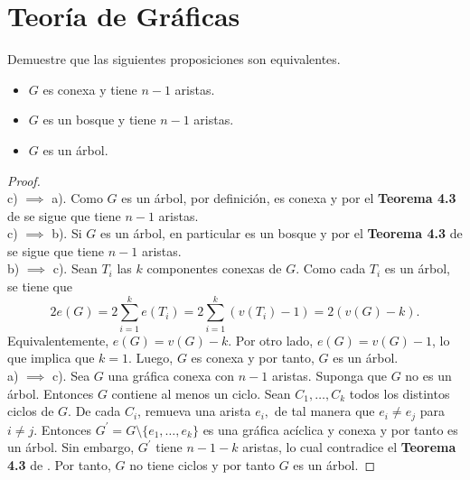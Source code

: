 \documentclass[12pt]{article}
\newenvironment{problem}[2][Problema]{\begin{trivlist}
\item[\hskip \labelsep {\bfseries #1}\hskip \labelsep {\bfseries #2.}]}{\end{trivlist}}
\begin{document}
\section*{Teoría de Gráficas}


\begin{problem}{4.1.2}
Demuestre que las siguientes proposiciones son equivalentes. 
\begin{itemize}
    \item[a)] $G$ es conexa y tiene $n-1$ aristas.
    \item[b)] $G$ es un bosque y tiene $n-1$ aristas.
    \item[c)] $G$ es un árbol.
\end{itemize}
\end{problem}

\begin{proof} \textbf{}\\
c) $\implies$ a). Como $G$ es un árbol, por definición, es conexa y por el  \textbf{Teorema 4.3} de \cite{10.5555/1481153} se sigue que tiene $n-1$ aristas. \\
c) $\implies$ b). Si $G$ es un árbol, en particular es un bosque y por el \textbf{Teorema 4.3} de \cite{10.5555/1481153} se sigue que tiene $n-1$ aristas.\\
b) $\implies$ c). Sean $T_i$ las $k$ componentes conexas de $G$. Como cada $T_i$ es un árbol, se tiene que
$$2 e(G) = 2 \sum_{i=1}^k e(T_i) = 2 \sum_{i=1}^k (v(T_i) - 1) = 2(v(G)-k).$$
Equivalentemente, $e(G) = v(G) - k.$ Por otro lado, $e(G) = v(G) - 1$, lo que implica que $k=1$. Luego, $G$ es conexa y  por tanto, $G$ es un árbol.\\
a) $\implies$ c). Sea $G$ una gráfica conexa con $n-1$ aristas. Suponga que $G$ no es un árbol. Entonces $G$ contiene al menos un ciclo. Sean $C_1, \ldots, C_k$ todos los distintos ciclos de $G.$ De cada $C_i$, remueva una arista $e_i,$ de tal manera que $e_i \neq e_j$ para $i \neq j.$ Entonces $G^\prime = G \setminus \{e_1, \ldots, e_k\}$ es una gráfica acíclica y conexa y por tanto es un árbol. Sin embargo, $G^\prime$ tiene $n-1-k$ aristas, lo cual contradice el \textbf{Teorema 4.3} de \cite{10.5555/1481153}. Por tanto, $G$ no tiene ciclos y por tanto $G$ es un árbol.
\end{proof}
\end{document}
